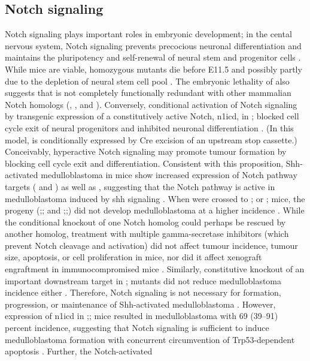 \subsection{Notch signaling}

Notch signaling plays important roles in embryonic development; in the cental nervous system, Notch signaling prevents precocious neuronal differentiation and maintains the pluripotency and self-renewal of neural stem and progenitor cells . While \high{+/-} mice are viable, homozygous  mutants die before E11.5 and possibly partly due to the depletion of neural stem cell pool . The embryonic lethality of \high{-/-} also suggests that  is not completely functionally redundant with other mammalian Notch homologs (, , and ). Conversely, conditional activation of Notch signaling by transgenic expression of a constitutively active Notch, \gls{n1icd}, in ; blocked cell cycle exit of neural progenitors and inhibited neuronal differentiation . (In this model,  is conditionally expressed by Cre excision of an upstream stop cassette.) Conceivably, hyperactive Notch signaling may promote tumour formation by blocking cell cycle exit and differentiation. Consistent with this proposition, Shh-activated medulloblastoma in  mice show increased expression of Notch pathway targets ( and ) as well as , suggesting that the Notch pathway is active in medulloblastoma induced by \gls{shh} signaling . When  were crossed to ; or ; mice, the progeny (;; and ;;) did not develop medulloblastoma at a higher incidence . While the conditional knockout of one Notch homolog could perhaps be rescued by another homolog, treatment with multiple gamma-secretase inhibitors (which prevent Notch cleavage and activation) did not affect tumour incidence, tumour size, apoptosis, or cell proliferation in  mice, nor did it affect xenograft engraftment in immunocompromised mice . Similarly, constitutive knockout of an important downstream target  in ;\high{-/-} mutants did not reduce medulloblastoma incidence either . Therefore, Notch signaling is not necessary for formation, progression, or maintenance of Shh-activated medulloblastoma . However, expression of \gls{n1icd} in ;;\high{-/-} mice resulted in medulloblastoma with 69 (39--91) percent incidence, suggesting that Notch signaling is sufficient to induce medulloblastoma formation with concurrent circumvention of Trp53-dependent apoptosis . Further, the Notch-activated 